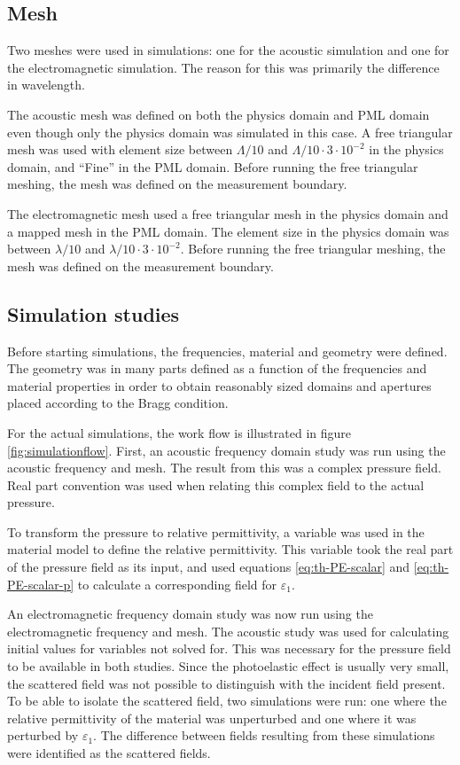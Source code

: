 \documentclass[11pt,twoside]{eitExjobb}
\begin{document}
	\subsection{Mesh}
	Two meshes were used in simulations: one for the acoustic simulation and one for the electromagnetic simulation. The reason for this was primarily the difference in wavelength.
	
	The acoustic mesh was defined on both the physics domain and PML domain even though only the physics domain was simulated in this case. A free triangular mesh was used with element size between $\Lambda/10$ and $\Lambda/10 \cdot 3 \cdot 10^{-2}$ in the physics domain, and ``Fine'' in the PML domain. Before running the free triangular meshing, the mesh was defined on the measurement boundary.
	
	The electromagnetic mesh used a free triangular mesh in the physics domain and a mapped mesh in the PML domain. The element size in the physics domain was between $\lambda/10$ and $\lambda/10 \cdot 3 \cdot 10^{-2}$. Before running the free triangular meshing, the mesh was defined on the measurement boundary.
	
	\subsection{Simulation studies}
	Before starting simulations, the frequencies, material and geometry were defined. The geometry was in many parts defined as a function of the frequencies and material properties in order to obtain reasonably sized domains and apertures placed according to the Bragg condition.
	
	For the actual simulations, the work flow is illustrated in figure \ref{fig:simulationflow}. First, an acoustic frequency domain study was run using the acoustic frequency and mesh. The result from this was a complex pressure field. Real part convention was used when relating this complex field to the actual pressure.
	
	To transform the pressure to relative permittivity, a variable was used in the material model to define the relative permittivity. This variable took the real part of the pressure field as its input, and used equations \eqref{eq:th-PE-scalar} and \eqref{eq:th-PE-scalar-p} to calculate a corresponding field for $\varepsilon_1$.
	
	An electromagnetic frequency domain study was now run using the electromagnetic frequency and mesh. The acoustic study was used for calculating initial values for variables not solved for. This was necessary for the pressure field to be available in both studies. Since the photoelastic effect is usually very small, the scattered field was not possible to distinguish with the incident field present. To be able to isolate the scattered field, two simulations were run: one where the relative permittivity of the material was unperturbed and one where it was perturbed by $\varepsilon_1$. The difference between fields resulting from these simulations were identified as the scattered fields.
	
\end{document}
